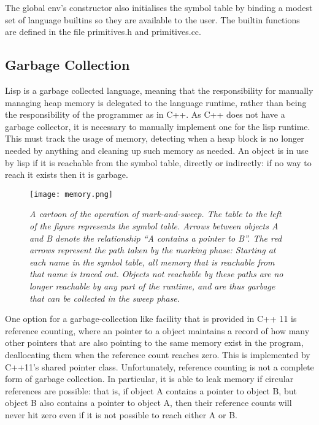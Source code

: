 \documentclass[12pt]{article}
\begin{document}
The global env's constructor also initialises the symbol table by
binding a modest set of language builtins so they are available to the
user. The builtin functions are defined in the file primitives.h and
primitives.cc.


\subsection{Garbage Collection}
\label{section:garbage}


Lisp is a garbage collected language, meaning that the responsibility
for manually managing heap memory is delegated to the language
runtime, rather than being the responsibility of the programmer as in
C++. As C++ does not have a garbage collector, it is necessary to
manually implement one for the lisp runtime. This must track the usage
of memory, detecting when a heap block is no longer needed by anything
and cleaning up such memory as needed. An object is in use by lisp if
it is reachable from the symbol table, directly or indirectly: if no
way to reach it exists then it is garbage.


\begin{figure}
  \centering
  \texttt{[image: memory.png]}
  \caption{\textit{
  A cartoon of the operation of mark-and-sweep. The table to the left of
  the figure represents the symbol table. Arrows between objects A and B
  denote the relationship ``A contains a pointer to B''. The red arrows
  represent the path taken by the marking phase: Starting at each name
  in the symbol table, all memory that is reachable from that name is
  traced out. Objects not reachable by these paths are no longer
  reachable by any part of the runtime, and are thus garbage that can be
  collected in the sweep phase.
  }}
\end{figure}

One option for a garbage-collection like facility that is provided in
C++ 11 is reference counting, where an pointer to a object maintains a
record of how many other pointers that are also pointing to the same
memory exist in the program, deallocating them when the reference
count reaches zero. This is implemented by C++11's shared pointer
class. Unfortunately, reference counting is not a complete form of
garbage collection. In particular, it is able to leak memory if
circular references are possible: that is, if object A contains a
pointer to object B, but object B also contains a pointer to object A,
then their reference counts will never hit zero even if it is not
possible to reach either A or B.
\end{document}
